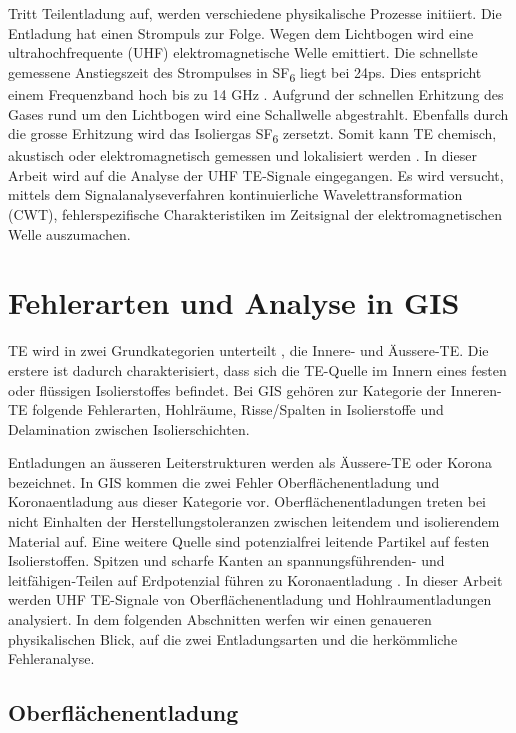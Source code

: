 \begin{refsection}
Tritt Teilentladung auf, werden verschiedene  physikalische Prozesse initiiert. 
Die Entladung hat einen Strompuls zur Folge.
Wegen dem Lichtbogen wird eine ultrahochfrequente (UHF) elektromagnetische Welle emittiert.
Die schnellste gemessene Anstiegszeit des Strompulses in SF\textsubscript{6} liegt bei 24ps.
Dies entspricht einem Frequenzband hoch bis zu 14 GHz \cite{skript:Judd24ps}. 
Aufgrund der schnellen Erhitzung des Gases rund um den Lichtbogen wird eine Schallwelle abgestrahlt. 
Ebenfalls durch die grosse Erhitzung wird das Isoliergas SF\textsubscript{6} zersetzt. 
Somit kann TE chemisch, akustisch oder elektromagnetisch gemessen und lokalisiert werden \cite{skript:StatusReviewPDMeasurement}.
In dieser Arbeit wird auf die Analyse der UHF TE-Signale eingegangen.
Es wird versucht, mittels dem Signalanalyseverfahren kontinuierliche Wavelettransformation (CWT), fehlerspezifische Charakteristiken im Zeitsignal der elektromagnetischen Welle auszumachen.

\section{Fehlerarten und Analyse in GIS}

TE wird in zwei Grundkategorien unterteilt \cite{buch:Kuchler}, die Innere- und Äussere-TE. 
Die erstere ist dadurch charakterisiert, dass sich die TE-Quelle im Innern eines festen oder flüssigen Isolierstoffes befindet. 
Bei GIS gehören zur Kategorie der Inneren-TE folgende Fehlerarten, Hohlräume, Risse/Spalten in Isolierstoffe und Delamination zwischen Isolierschichten.
 
Entladungen an äusseren Leiterstrukturen werden als Äussere-TE oder Korona bezeichnet. 
In GIS kommen die zwei Fehler Oberflächenentladung und Koronaentladung aus dieser Kategorie vor.
Oberflächenentladungen treten bei nicht Einhalten der Herstellungstoleranzen zwischen leitendem und isolierendem Material auf.
Eine weitere Quelle sind potenzialfrei leitende Partikel auf festen Isolierstoffen.
Spitzen und scharfe Kanten an spannungsführenden- und leitfähigen-Teilen auf Erdpotenzial führen zu Koronaentladung \cite{buch:Kuchler, skript:AeussreTE, skript:InnereTE}.
In dieser Arbeit werden UHF TE-Signale von Oberflächenentladung und Hohlraumentladungen analysiert. 
In dem folgenden Abschnitten werfen wir einen genaueren physikalischen Blick, auf die zwei Entladungsarten und die herkömmliche Fehleranalyse.

\subsection{Oberflächenentladung}


\end{refsection}
